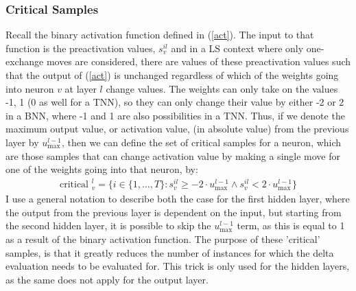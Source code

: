 \subsubsection{Critical Samples}
Recall the binary activation function defined in (\ref{act}). The input to that function is the preactivation values, $s_v^{il}$ and in a LS context where only one-exchange moves are considered, there are values of these preactivation values such that the output of (\ref{act}) is unchanged regardless of which of the weights going into neuron $v$ at layer $l$ change values. The weights can only take on the values -1, 1 (0 as well for a TNN), so they can only change their value by either -2 or 2 in a BNN, where -1 and 1 are also possibilities in a TNN. Thus, if we denote the maximum output value, or activation value, (in absolute value) from the previous layer by $u^{l-1}_{\max}$, then we can define the set of critical samples for a neuron, which are those samples that can change activation value by making a single move for one of the weights going into that neuron, by:
\begin{align}
    \label{critical} \text{critical }^l_ v = \{ i \in \{1, \ldots, T\}: s_v^{il} \geq -2 \cdot u^{l-1}_{\max} \wedge s_v^{il} < 2 \cdot u^{l-1}_{\max} \}
\end{align}
I use a general notation to describe both the case for the first hidden layer, where the output from the previous layer is dependent on the input, but starting from the second hidden layer, it is possible to skip the $u^{l-1}_{\max}$ term, as this is equal to 1 as a result of the binary activation function. The purpose of these 'critical' samples, is that it greatly reduces the number of instances for which the delta evaluation needs to be evaluated for. This trick is only used for the hidden layers, as the same does not apply for the output layer. 

